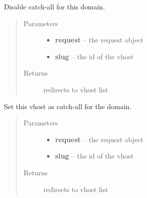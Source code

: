 \documentclass[letterpaper,10pt,english]{sphinxmanual}
\begin{document}
\begin{fulllineitems}
\label{api/web:limeade.web.views.vhost_catchall_delete}
Disable catch-all for this domain.
\begin{quote}\begin{description}
\item[{Parameters}] \leavevmode\begin{itemize}
\item {} 
\textbf{request} -- the request object

\item {} 
\textbf{slug} -- the id of the vhost

\end{itemize}

\item[{Returns}] \leavevmode
redirects to vhost list

\end{description}\end{quote}

\end{fulllineitems}


\begin{fulllineitems}
\label{api/web:limeade.web.views.vhost_catchall_set}
Set this vhost as catch-all for the domain.
\begin{quote}\begin{description}
\item[{Parameters}] \leavevmode\begin{itemize}
\item {} 
\textbf{request} -- the request object

\item {} 
\textbf{slug} -- the id of the vhost

\end{itemize}

\item[{Returns}] \leavevmode
redirects to vhost list

\end{description}\end{quote}

\end{fulllineitems}
\end{document}
